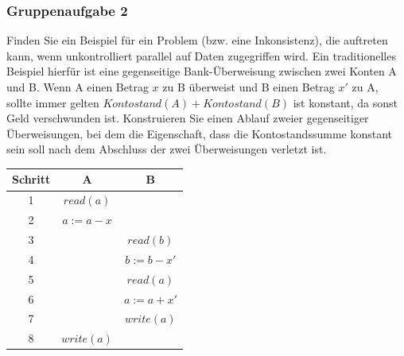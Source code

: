 \begin{frame}
	\frametitle{Gruppenaufgabe 2}
	\vspace{0.5cm}

	Finden Sie ein Beispiel für ein Problem (bzw. eine Inkonsistenz),
	die auftreten kann, wenn unkontrolliert parallel auf Daten zugegriffen wird.
	Ein traditionelles Beispiel hierfür ist eine gegenseitige Bank-Überweisung zwischen zwei
	Konten A und B. Wenn A einen Betrag \( x \) zu B überweist und B einen Betrag \( x' \)
	zu A, sollte immer gelten \( Kontostand(A) + Kontostand(B) \) ist konstant,
	da sonst Geld verschwunden ist.
	Konstruieren Sie einen Ablauf zweier gegenseitiger Überweisungen,
	bei dem die Eigenschaft, dass die Kontostandssumme konstant sein soll nach dem
	Abschluss der zwei Überweisungen verletzt ist.

	\pause
	\begin{table}[]
		\begin{tabular}{c|c|c}
			Schritt & A                & B                 \\ \hline
			1       & \( read(a) \)    &                   \\
			2       & \( a := a - x \) &                   \\
			3       &                  & \( read(b) \)     \\
			4       &                  & \( b := b - x' \) \\
			5       &                  & \( read(a) \)     \\
			6       &                  & \( a := a + x' \) \\
			7       &                  & \( write(a) \)    \\
			8       & \( write(a) \)   &                   \\
		\end{tabular}
	\end{table}
\end{frame}

